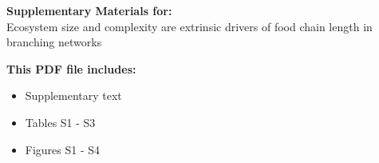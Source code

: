\begin{center}
\LARGE{\textbf{Supplementary Materials for:}}\\[7.5mm]
\LARGE{Ecosystem size and complexity are extrinsic drivers of food chain length in branching networks}\\[7.5mm]
\end{center}
\begin{flushleft}
\textbf{This PDF file includes:}
\begin{itemize}
\item Supplementary text
\item Tables S1 - S3
\item Figures S1 - S4
\end{itemize}
\end{flushleft}

\newpage